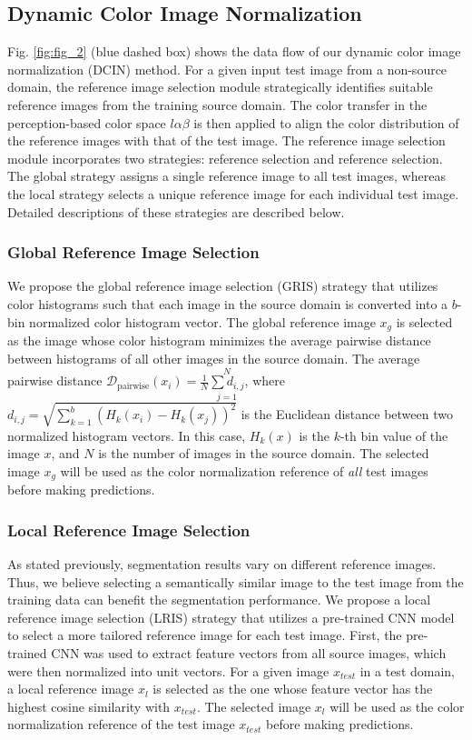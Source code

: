 \subsection{Dynamic Color Image Normalization}
Fig. \ref{fig:fig_2} (blue dashed box) shows the data flow of our dynamic color image normalization (DCIN) method. 
For a given input test image from a non-source domain, the reference image selection module strategically identifies suitable reference images from the training source domain. 
The color transfer in the perception-based color space $l\alpha \beta$ \cite{reinhard2001color} is then applied to align the color distribution of the reference images with that of the test image. 
The reference image selection module incorporates two strategies:  reference selection and  reference selection. 
The global strategy assigns a single reference image to all test images, whereas the local strategy selects a unique reference image for each individual test image. 
Detailed descriptions of these strategies are described below. 

\subsubsection{Global Reference Image Selection}
We propose the global reference image selection (GRIS) strategy that utilizes color histograms such that each image in the source domain is converted into a $b$-bin normalized color histogram vector. 
The global reference image $x_g$ is selected as the image whose color histogram minimizes the average pairwise distance between histograms of all other images in the source domain. 
The average pairwise distance $\mathcal{D}_{\mathrm{pairwise}}(x_i) = \frac1N\overset N{\underset{j=1}{\sum d_{i,j}}}$, where $d_{i,j}=\sqrt{\sum_{k=1}^b\left(H_k\left(x_i\right)-H_k\left(x_j\right)\right)^2}$ is the Euclidean distance between two normalized histogram vectors. 
In this case, $H_k(x)$ is the $k$-th bin value of the image $x$, and $N$ is the number of images in the source domain. 
The selected image $x_g$ will be used as the color normalization reference of \textit{all} test images before making predictions. 

\subsubsection{Local Reference Image Selection}
As stated previously, segmentation results vary on different reference images. 
Thus, we believe selecting a semantically similar image to the test image from the training data can benefit the segmentation performance. 
We propose a local reference image selection (LRIS) strategy that utilizes a pre-trained CNN model to select a more tailored reference image for each test image. 
First, the pre-trained CNN was used to extract feature vectors from all source images, which were then normalized into unit vectors. 
For a given image $x_{test}$ in a test domain, a local reference image $x_l$ is selected as the one whose feature vector has the highest cosine similarity with $x_{test}$. 
The selected image $x_l$ will be used as the color normalization reference of the test image $x_{test}$ before making predictions. 

